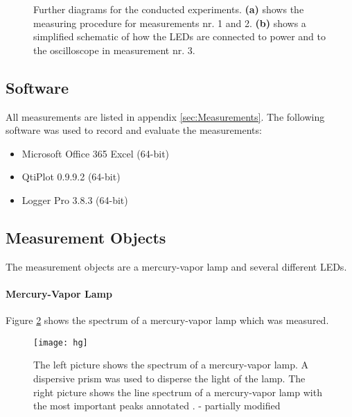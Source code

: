 \begin{figure}[H]
	\hfill
	\caption{Further diagrams for the conducted experiments. \textbf{(a)} shows the measuring procedure for measurements nr. 1 and 2. \textbf{(b)} shows a simplified schematic of how the LEDs are connected to power and to the oscilloscope in measurement nr. 3.}
	\label{fig:experimental_arrangement_diagram}
\end{figure}


\subsection{Software}
\label{subsec:Software}
All measurements are listed in appendix \ref{sec:Measurements}. The following software was used to record and evaluate the measurements:

\begin{itemize}
	\item Microsoft Office 365 Excel (64-bit)
	\item QtiPlot 0.9.9.2 (64-bit)
	\item Logger Pro 3.8.3 (64-bit)
\end{itemize}

\newpage
\subsection{Measurement Objects}
\label{subsec:measurement_objects}
The measurement objects are a mercury-vapor lamp and several different LEDs.

\paragraph{Mercury-Vapor Lamp}
Figure \ref{fig:hg} shows the spectrum of a mercury-vapor lamp which was measured.

\begin{figure}[H]
	\centering
	\texttt{[image: hg]}
	\caption{The left picture shows the spectrum of a mercury-vapor lamp. A dispersive prism was used to disperse the light of the lamp. The right picture shows the line spectrum of a mercury-vapor lamp with the most important peaks annotated \cite{mercury-vapor_lamp_picture}. - partially modified}
	\label{fig:hg}
\end{figure}


